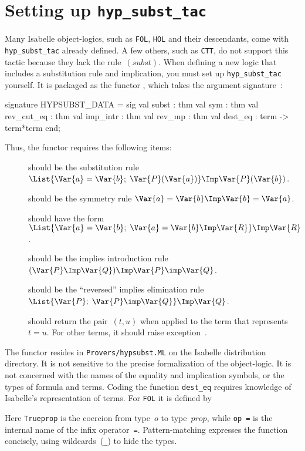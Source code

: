 \section{Setting up {\tt hyp_subst_tac}} 
Many Isabelle object-logics, such as {\tt FOL}, {\tt HOL} and their
descendants, come with {\tt hyp_subst_tac} already defined.  A few others,
such as {\tt CTT}, do not support this tactic because they lack the
rule~$(subst)$.  When defining a new logic that includes a substitution
rule and implication, you must set up {\tt hyp_subst_tac} yourself.  It
is packaged as the \ML{} functor , which takes the
argument signature~:
\begin{ttbox} 
signature HYPSUBST_DATA =
  sig
  val subst      : thm
  val sym        : thm
  val rev_cut_eq : thm
  val imp_intr   : thm
  val rev_mp     : thm
  val dest_eq    : term -> term*term
  end;
\end{ttbox}
Thus, the functor requires the following items:
\begin{description}
\item[] should be the substitution rule
$\List{\Var{a}=\Var{b};\; \Var{P}(\Var{a})} \Imp \Var{P}(\Var{b})$.

\item[] should be the symmetry rule
$\Var{a}=\Var{b}\Imp\Var{b}=\Var{a}$.

\item[] should have the form
$\List{\Var{a}=\Var{b};\; \Var{a}=\Var{b}\Imp\Var{R}} \Imp \Var{R}$.

\item[] should be the implies introduction
rule $(\Var{P}\Imp\Var{Q})\Imp \Var{P}\imp\Var{Q}$.

\item[] should be the ``reversed'' implies elimination
rule $\List{\Var{P};  \;\Var{P}\imp\Var{Q}} \Imp \Var{Q}$.

\item[] should return the pair~$(t,u)$ when
applied to the \ML{} term that represents~$t=u$.  For other terms, it
should raise exception~.
\end{description}
The functor resides in {\tt Provers/hypsubst.ML} on the Isabelle
distribution directory.  It is not sensitive to the precise formalization
of the object-logic.  It is not concerned with the names of the equality
and implication symbols, or the types of formula and terms.  Coding the
function {\tt dest_eq} requires knowledge of Isabelle's representation of
terms.  For {\tt FOL} it is defined by
Here {\tt Trueprop} is the coercion from type~$o$ to type~$prop$, while
\hbox{\tt op =} is the internal name of the infix operator~{\tt=}.
Pattern-matching expresses the function concisely, using wildcards~({\tt_})
to hide the types.


